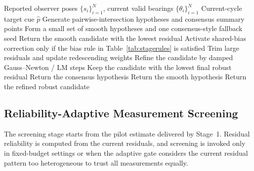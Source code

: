 \documentclass[drones,article,submit,pdftex,moreauthors]{Definitions/mdpi}
\begin{document}
\begin{algorithm}[!htbp]
\caption{Consensus-Assisted Robust Fusion}
\label{alg:frontend}
\begin{algorithmic}
\Require Reported observer poses $\{s_i\}_{i=1}^N$, current valid bearings $\{\theta_i\}_{i=1}^N$
\Ensure Current-cycle target cue $\hat{p}$
\State Generate pairwise-intersection hypotheses and consensus summary points
\State Form a small set of smooth hypotheses and one consensus-style fallback seed
    \State Return the smooth candidate with the lowest residual
\EndIf
{}
    \State Activate shared-bias correction only if the bias rule in Table~\ref{tab:stagerules} is satisfied
    \State Trim large residuals and update redescending weights
    \State Refine the candidate by damped Gauss--Newton / LM steps
\EndFor
\State Keep the candidate with the lowest final robust residual
    \State Return the consensus hypothesis
    \State Return the smooth hypothesis
\Else
    \State Return the refined robust candidate
\EndIf
\end{algorithmic}
\end{algorithm}



\subsection{Reliability-Adaptive Measurement Screening}

The screening stage starts from the pilot estimate delivered by Stage~1. Residual reliability is computed from the current residuals, and screening is invoked only in fixed-budget settings or when the adaptive gate considers the current residual pattern too heterogeneous to trust all measurements equally.
\end{document}
